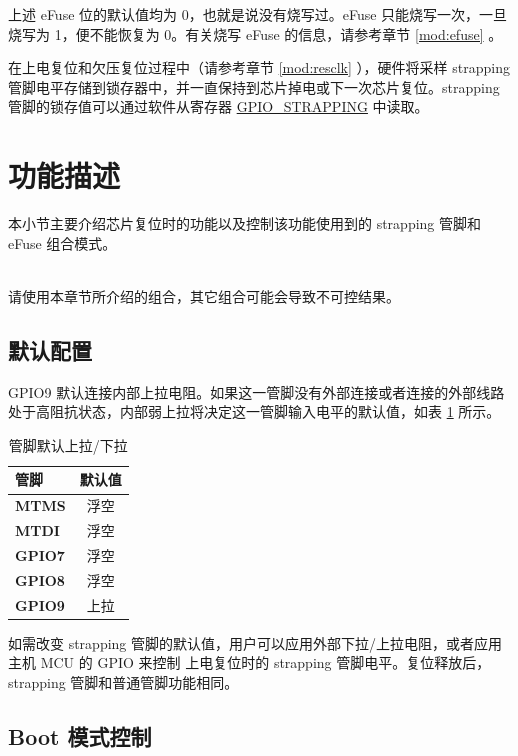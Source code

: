 \documentclass[main\_\_CN.tex]{subfiles}
\begin{document}
上述 eFuse 位的默认值均为 0，也就是说没有烧写过。eFuse 只能烧写一次，一旦烧写为 1，便不能恢复为 0。有关烧写 eFuse 的信息，请参考章节 \ref{mod:efuse} \textit{}。

在上电复位和欠压复位过程中（请参考章节 \ref{mod:resclk} \textit{}），硬件将采样 strapping 管脚电平存储到锁存器中，并一直保持到芯片掉电或下一次芯片复位。strapping 管脚的锁存值可以通过软件从寄存器 \hyperref[fielddesc:GPIOSTRAPPING]{GPIO\_STRAPPING} 中读取。


\section{功能描述}
本小节主要介绍芯片复位时的功能以及控制该功能使用到的 strapping 管脚和 eFuse 组合模式。

\begin{importantlisting}\\
请使用本章节所介绍的组合，其它组合可能会导致不可控结果。
\end{importantlisting}

\subsection{默认配置}

GPIO9 默认连接内部上拉电阻。如果这一管脚没有外部连接或者连接的外部线路处于高阻抗状态，内部弱上拉将决定这一管脚输入电平的默认值，如表 \ref{tab:bootctrl-default-config-strapping-pins} 所示。

\begin{longtable}[c]{|p{1.5cm}|c|}
\caption{管脚默认上拉/下拉}
\label{tab:bootctrl-default-config-strapping-pins} \\
    \hline
    \rowcolor{lightgray}
  \textbf{管脚} & \textbf{默认值} \\ \hline
  \textbf{MTMS} & 浮空 \\ \hline
  \textbf{MTDI} & 浮空 \\ \hline
  \textbf{GPIO7} & 浮空 \\ \hline
  \textbf{GPIO8} & 浮空 \\ \hline
  \textbf{GPIO9} & 上拉 \\ \hline
\end{longtable}

如需改变 strapping 管脚的默认值，用户可以应用外部下拉/上拉电阻，或者应用主机 MCU 的 GPIO 来控制 \chipname{} 上电复位时的 strapping 管脚电平。复位释放后，strapping 管脚和普通管脚功能相同。


\subsection{Boot 模式控制} \label{sec:bootModeControl}
\end{document}
